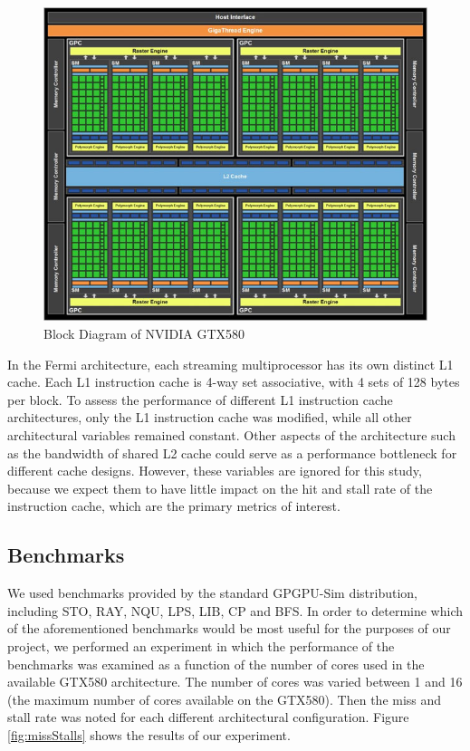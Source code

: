 \begin{figure}[b]
\centering
\includegraphics[width=\columnwidth]{graphics/GTX580.jpg}
\caption{Block Diagram of NVIDIA GTX580~\cite{gf100}}
\label{GTX580}
\end{figure}

In the Fermi architecture, each streaming multiprocessor has
its own distinct L1 cache. 
Each L1 instruction cache is 4-way set associative, with 4 sets of
128 bytes per block. 
To assess the  performance of different L1 instruction cache
architectures, only the L1 instruction cache was modified, while all
other architectural variables remained constant. 
Other aspects of the architecture such as the bandwidth of shared L2
cache could serve as a performance bottleneck for different cache
designs. 
However, these variables are ignored for this study, because we expect
them to have little impact on the hit and stall rate of the
instruction cache, which are the primary metrics of interest.

\subsection{Benchmarks}

We used benchmarks provided by the standard GPGPU-Sim distribution,
including STO, RAY, NQU, LPS, LIB, CP and BFS.
In order to determine which of the aforementioned benchmarks would be
most useful for the purposes of our project, we performed an
experiment in which the performance of the benchmarks was examined as
a function of the number of cores used in the available GTX580
architecture. 
The number of cores was varied between 1 and 16 (the maximum number of
cores available on the GTX580). 
Then the miss and stall rate was noted for each different
architectural configuration. 
Figure \ref{fig:missStalls} shows the results of our experiment. 

